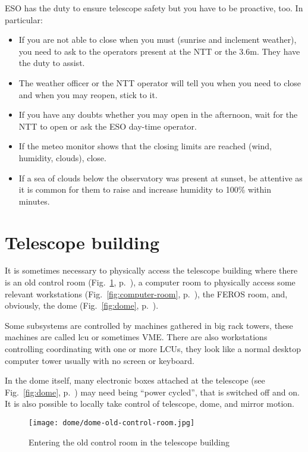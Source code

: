 \documentclass[11pt,fleqn]{book}
\def\figref#1{Fig.~\ref{fig:#1}, p.~\pageref{fig:#1}}
\begin{document}
ESO has the duty to ensure telescope safety but you have to be proactive, too.  In particular:
\begin{itemize}
\item If you are not able to close when you must (sunrise and inclement weather), you need to ask to the operators present at the NTT or the 3.6m. They have the duty to assist.  
\item The weather officer or the NTT operator will tell you when you need to close and when you may reopen, stick to it.
\item If you have any doubts whether you may open in the afternoon, wait for the NTT to open or ask the ESO day-time operator.
\item If the meteo monitor shows that the closing limits are reached (wind, humidity, clouds), close.
\item If a sea of clouds below the observatory was present at sunset, be attentive as it is common for them to raise and increase humidity to 100\% within minutes.
\end{itemize}

\section{Telescope building}

It is sometimes necessary to physically access the telescope building where there is an old control room (\figref{old-control-room}), a computer room to physically access some relevant workstations (\figref{computer-room}), the FEROS room, and, obviously, the dome (\figref{dome}).  

Some subsystems are controlled by machines gathered in big rack towers, these machines are called \gls{lcu} or sometimes VME.  There are also workstations controlling coordinating with one or more LCUs, they look like a normal desktop computer tower usually with no screen or keyboard.

In the dome itself, many electronic boxes attached at the telescope (see \figref{dome}) may need being ``power cycled'', that is switched off and on.  It is also possible to locally take control of telescope, dome, and mirror motion.

\begin{figure}[!ht]
\centering
\texttt{[image: dome/dome-old-control-room.jpg]}
\caption{Entering the old control room in the telescope building}
\label{fig:old-control-room}
\end{figure}
\end{document}
